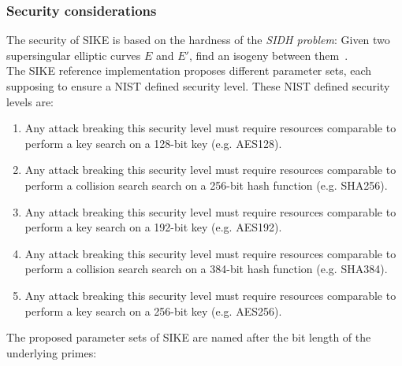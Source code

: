 \subsubsection{Security considerations}\label{sidh_security}
The security of SIKE is based on the hardness of the \textit{SIDH problem}: Given two supersingular elliptic curves $E$ and $E'$, find an isogeny between them~\parencite{sike2020spec}. 
\\
The SIKE reference implementation proposes different parameter sets, each supposing to ensure a NIST defined security level. These NIST defined security levels are:
\begin{enumerate}
	\item Any attack breaking this security level must require resources comparable to perform a key search on a 128-bit key (e.g. AES128).
	\item Any attack breaking this security level must require resources comparable to perform a collision search search on a 256-bit hash function (e.g. SHA256).
	\item Any attack breaking this security level must require resources comparable to perform a key search on a 192-bit key (e.g. AES192).
	\item Any attack breaking this security level must require resources comparable to perform a collision search search on a 384-bit hash function (e.g. SHA384).
	\item Any attack breaking this security level must require resources comparable to perform a key search on a 256-bit key (e.g. AES256).
\end{enumerate}
The proposed parameter sets of SIKE are named after the bit length of the underlying primes:

